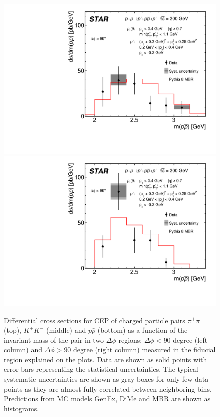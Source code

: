 \begin{figure}[t]
\hspace*{5pt}
\includegraphics[width=.46\textwidth,page=1]{graphics/physicsResults/FinalResult_InvMass_DeltaPhiBin1_proton.pdf}
\hfill
\includegraphics[width=.46\textwidth,page=1]{graphics/physicsResults/FinalResult_InvMass_DeltaPhiBin2_proton.pdf}
\hspace*{5pt}
%
\caption{Differential cross sections for CEP of charged particle pairs $\pi^+\pi^-$ (top), $K^+K^-$ (middle) and $p\bar{p}$ (bottom) as a function of the invariant mass of the pair in two $\Delta\phi$ regions: $\Delta\phi<90$ degree (left column) and $\Delta\phi>90$ degree (right column) measured in the fiducial region explained on the plots. Data are shown as solid points with error bars representing the statistical uncertainties. The typical systematic uncertainties are shown as gray boxes for only few data points as they are almost fully correlated between neighboring bins. Predictions from MC models GenEx, DiMe and MBR are shown as histograms.}
\label{results_3}
\end{figure}
